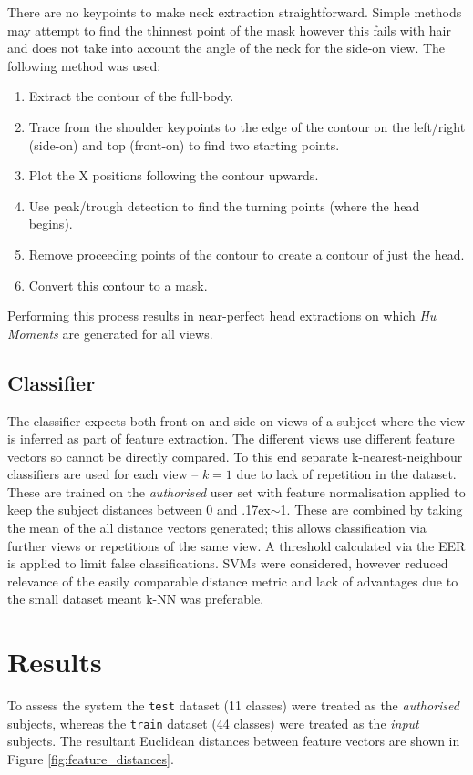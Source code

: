 \documentclass[conference]{IEEEtran}
\newcommand{\mytilde}{\raise.17ex\hbox{$\scriptstyle\mathtt{\sim}$}}
\begin{document}
\noindent There are no keypoints to make neck extraction straightforward. Simple methods may attempt to find the thinnest point of the mask however this fails with hair and does not take into account the angle of the neck for the side-on view. The following method was used:
\begin{enumerate}
  \item Extract the contour of the full-body.
  \item Trace from the shoulder keypoints to the edge of the contour on the left/right (side-on) and top (front-on) to find two starting points.
  \item Plot the X positions following the contour upwards.
  \item Use peak/trough detection to find the turning points (where the head begins).
  \item Remove proceeding points of the contour to create a contour of just the head.
  \item Convert this contour to a mask.
\end{enumerate}
Performing this process results in near-perfect head extractions on which \textit{Hu Moments} are generated for all views.


\subsection{Classifier}
\noindent The classifier expects both front-on and side-on views of a subject where the view is inferred as part of feature extraction. The different views use different feature vectors so cannot be directly compared. To this end separate k-nearest-neighbour classifiers are used for each view -- $k=1$ due to lack of repetition in the dataset. These are trained on the \textit{authorised} user set with feature normalisation applied to keep the subject distances between 0 and \mytilde 1. These are combined by taking the mean of the all distance vectors generated; this allows classification via further views or repetitions of the same view. A threshold calculated via the EER is applied to limit false classifications. SVMs were considered, however reduced relevance of the easily comparable distance metric and lack of advantages due to the small dataset meant k-NN was preferable.
\section{Results}
\noindent To assess the system the \texttt{test} dataset (11 classes) were treated as the \textit{authorised} subjects, whereas the \texttt{train} dataset (44 classes) were treated as the \textit{input} subjects. The resultant Euclidean distances between feature vectors are shown in Figure \ref{fig:feature_distances}.
\end{document}
